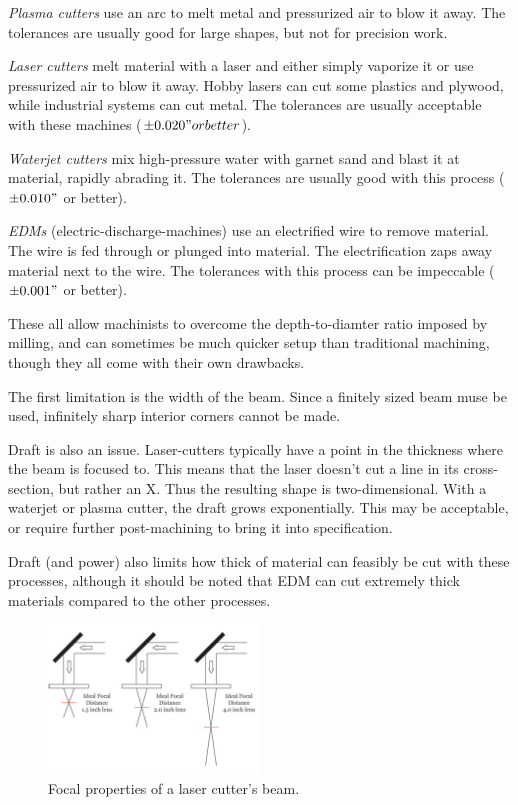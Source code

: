  \begin{asparaenum}[a)]
  	\item \textit{Plasma cutters} use an arc to melt metal and pressurized air to blow it away. The tolerances are usually good for large shapes, but not for precision work.
 	\item \textit{Laser cutters} melt material with a laser and either simply vaporize it or use pressurized air to blow it away. Hobby lasers can cut some plastics and plywood, while industrial systems can cut metal. The tolerances are usually acceptable with these machines ($\pm 0.020" or better$).
 	\item \textit{Waterjet cutters} mix high-pressure water with garnet sand and blast it at material, rapidly abrading it. The tolerances are usually good with this process ($\pm 0.010"$ or better).
 	\item \textit{EDMs} (electric-discharge-machines) use an electrified wire to remove material. The wire is fed through or plunged into material. The electrification zaps away material next to the wire. The tolerances with this process can be impeccable ($\pm 0.001"$ or better). 
\end{asparaenum}
 	
 	These all allow machinists to overcome the depth-to-diamter ratio imposed by milling, and can sometimes be much quicker setup than traditional machining, though they all come with their own drawbacks.
  
  The first limitation is the width of the beam. Since a finitely sized beam muse be used, infinitely sharp interior corners cannot be made.
 
  Draft is also an issue. Laser-cutters typically have a point in the thickness where the beam is focused to. This means that the laser doesn't cut a line in its cross-section, but rather an X. Thus the resulting shape is two-dimensional. With a waterjet or plasma cutter, the draft grows exponentially. This may be acceptable, or require further post-machining to bring it into specification.
 
  Draft (and power) also limits how thick of material can feasibly be cut with these processes, although it should be noted that EDM can cut extremely thick materials compared to the other processes.

 \begin{figure}[H] \centering
 	\includegraphics[width=0.5\textwidth]{imgs/lasercut_focus.jpeg}
 	\caption{Focal properties of a laser cutter's beam.}
 \end{figure}
 
